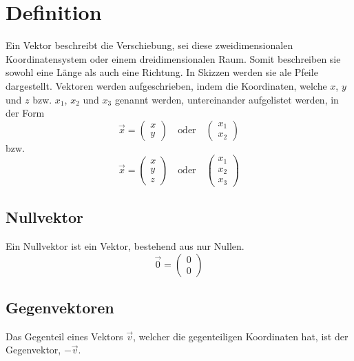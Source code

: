 \documentclass{article}
\begin{document}
 
\newcommand{\norm}[1]{\left| {#1} \right|}  
\newcommand{\vect}[1]{\overrightarrow{#1}} 
 
\section{Definition}
Ein Vektor beschreibt die Verschiebung, sei diese zweidimensionalen Koordinatensystem oder einem dreidimensionalen Raum. Somit beschreiben sie sowohl eine Länge als auch eine Richtung. In Skizzen werden sie ale Pfeile dargestellt. Vektoren werden aufgeschrieben, indem die Koordinaten, welche $x$, $y$ und $z$ bzw. $x_1$, $x_2$ und $x_3$ genannt werden, untereinander aufgelistet werden, in der Form 
\[
 \vect{x} = \begin{pmatrix} x \\ y \end{pmatrix}
 \quad \text{oder} \quad
 \begin{pmatrix} x_1 \\ x_2 \end{pmatrix}
\]
bzw. 
\[
 \vect{x} = \begin{pmatrix} x \\ y \\ z \end{pmatrix}
 \quad \text{oder} \quad
 \begin{pmatrix} x_1 \\ x_2 \\ x_3 \end{pmatrix}
\]
 
\subsection{Nullvektor}
Ein Nullvektor ist ein Vektor, bestehend aus nur Nullen.
\[
 \vect{0} = \begin{pmatrix} 0 \\ 0 \end{pmatrix}
\]
 
\subsection{Gegenvektoren}
Das Gegenteil eines Vektors $\vect{v}$, welcher die gegenteiligen Koordinaten hat, ist der Gegenvektor, $-\vect{v}$.
 
\end{document}
